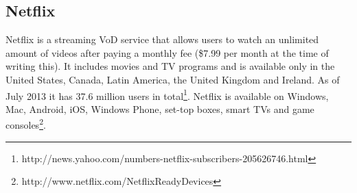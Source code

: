 \subsection{Netflix}
Netflix is a streaming VoD service that allows users to watch an unlimited amount of videos after paying a monthly fee (\$7.99 per month at the time of writing this). It includes movies and TV programs and is available only in the United States, Canada, Latin America, the United Kingdom and Ireland. As of July 2013 it has 37.6 million users in total\footnote{http://news.yahoo.com/numbers-netflix-subscribers-205626746.html}. Netflix is available on Windows, Mac, Android, iOS, Windows Phone, set-top boxes, smart TVs and game consoles\footnote{http://www.netflix.com/NetflixReadyDevices}.